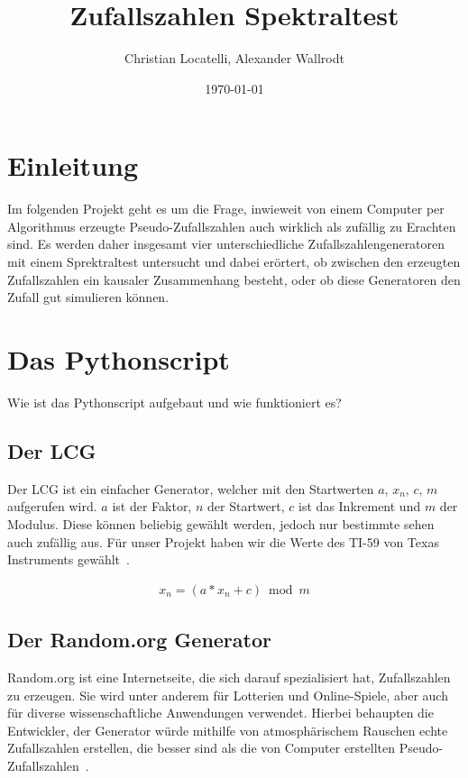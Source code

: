 \documentclass[12pt]{article}
\title{\textbf{Zufallszahlen Spektraltest}}
\author{Christian Locatelli, Alexander Wallrodt}
\date{\today}
\begin{document}
    \maketitle
    \clearpage

    \tableofcontents
    \listoftables
    \listoffigures

    \clearpage

    \section{Einleitung}\label{sec:Einleitung}
    Im folgenden Projekt geht es um die Frage, inwieweit von einem Computer per Algorithmus erzeugte Pseudo-Zufallszahlen
    auch wirklich als zufällig zu Erachten sind.
    Es werden daher insgesamt vier unterschiedliche Zufallszahlengeneratoren mit einem Sprektraltest untersucht und dabei erörtert,
    ob zwischen den erzeugten Zufallszahlen ein kausaler Zusammenhang besteht,
    oder ob diese Generatoren den Zufall gut simulieren können.



    \section{Das Pythonscript}\label{sec:das-pythonscript}
    Wie ist das Pythonscript aufgebaut und wie funktioniert es?

    \subsection{Der LCG}\label{subsec:der-lcg}
    Der LCG ist ein einfacher Generator, welcher mit den Startwerten $a$, $x_n$, $c$, $m$ aufgerufen wird.
    $a$ ist der Faktor, $n$ der Startwert, $c$ ist das Inkrement und $m$ der Modulus.
    Diese können beliebig gewählt werden, jedoch nur bestimmte sehen auch zufällig aus.
    Für unser Projekt haben wir die Werte des TI-59 von Texas Instruments gewählt~\cite{lcg}.

    \begin{align*}
    x_n = (a * x_n + c) \bmod m
    \end{align*}

    \subsection{Der Random.org Generator}\label{subsec:der-random.org-generator}
    Random.org ist eine Internetseite, die sich darauf spezialisiert hat, Zufallszahlen zu erzeugen.
    Sie wird unter anderem für Lotterien und Online-Spiele, aber auch für diverse wissenschaftliche
    Anwendungen verwendet.
    Hierbei behaupten die Entwickler, der Generator würde mithilfe von atmosphärischem
    Rauschen echte Zufallszahlen erstellen, die besser sind als die von Computer erstellten Pseudo-Zufallszahlen~\cite{random-org}.
\end{document}
